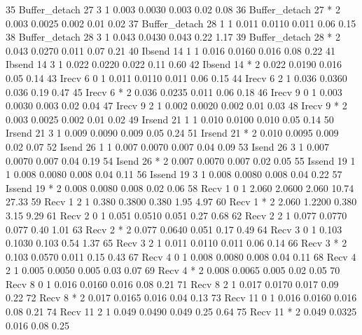 \begin{Output}
35 Buffer_detach   27    3     1 0.003 0.0030 0.003  0.02  0.08
36 Buffer_detach   27    *     2 0.003 0.0025 0.002  0.01  0.02
37 Buffer_detach   28    1     1 0.011 0.0110 0.011  0.06  0.15
38 Buffer_detach   28    3     1 0.043 0.0430 0.043  0.22  1.17
39 Buffer_detach   28    *     2 0.043 0.0270 0.011  0.07  0.21
40        Ibsend   14    1     1 0.016 0.0160 0.016  0.08  0.22
41        Ibsend   14    3     1 0.022 0.0220 0.022  0.11  0.60
42        Ibsend   14    *     2 0.022 0.0190 0.016  0.05  0.14
43         Irecv    6    0     1 0.011 0.0110 0.011  0.06  0.15
44         Irecv    6    2     1 0.036 0.0360 0.036  0.19  0.47
45         Irecv    6    *     2 0.036 0.0235 0.011  0.06  0.18
46         Irecv    9    0     1 0.003 0.0030 0.003  0.02  0.04
47         Irecv    9    2     1 0.002 0.0020 0.002  0.01  0.03
48         Irecv    9    *     2 0.003 0.0025 0.002  0.01  0.02
49        Irsend   21    1     1 0.010 0.0100 0.010  0.05  0.14
50        Irsend   21    3     1 0.009 0.0090 0.009  0.05  0.24
51        Irsend   21    *     2 0.010 0.0095 0.009  0.02  0.07
52         Isend   26    1     1 0.007 0.0070 0.007  0.04  0.09
53         Isend   26    3     1 0.007 0.0070 0.007  0.04  0.19
54         Isend   26    *     2 0.007 0.0070 0.007  0.02  0.05
55        Issend   19    1     1 0.008 0.0080 0.008  0.04  0.11
56        Issend   19    3     1 0.008 0.0080 0.008  0.04  0.22
57        Issend   19    *     2 0.008 0.0080 0.008  0.02  0.06
58          Recv    1    0     1 2.060 2.0600 2.060 10.74 27.33
59          Recv    1    2     1 0.380 0.3800 0.380  1.95  4.97
60          Recv    1    *     2 2.060 1.2200 0.380  3.15  9.29
61          Recv    2    0     1 0.051 0.0510 0.051  0.27  0.68
62          Recv    2    2     1 0.077 0.0770 0.077  0.40  1.01
63          Recv    2    *     2 0.077 0.0640 0.051  0.17  0.49
64          Recv    3    0     1 0.103 0.1030 0.103  0.54  1.37
65          Recv    3    2     1 0.011 0.0110 0.011  0.06  0.14
66          Recv    3    *     2 0.103 0.0570 0.011  0.15  0.43
67          Recv    4    0     1 0.008 0.0080 0.008  0.04  0.11
68          Recv    4    2     1 0.005 0.0050 0.005  0.03  0.07
69          Recv    4    *     2 0.008 0.0065 0.005  0.02  0.05
70          Recv    8    0     1 0.016 0.0160 0.016  0.08  0.21
71          Recv    8    2     1 0.017 0.0170 0.017  0.09  0.22
72          Recv    8    *     2 0.017 0.0165 0.016  0.04  0.13
73          Recv   11    0     1 0.016 0.0160 0.016  0.08  0.21
74          Recv   11    2     1 0.049 0.0490 0.049  0.25  0.64
75          Recv   11    *     2 0.049 0.0325 0.016  0.08  0.25

\end{Output}
